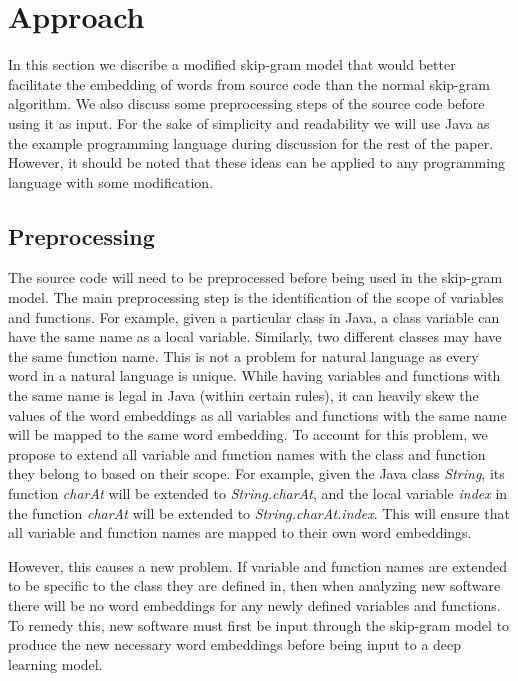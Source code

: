 \section{Approach} \label{approach}

In this section we discribe a modified skip-gram model that would better facilitate the embedding of words from source code than the normal skip-gram algorithm. We also discuss some preprocessing steps of the source code before using it as input. For the sake of simplicity and readability we will use Java as the example programming language during discussion for the rest of the paper. However, it should be noted that these ideas can be applied to any programming language with some modification.

\subsection{Preprocessing}

The source code will need to be preprocessed before being used in the skip-gram model. The main preprocessing step is the identification of the scope of variables and functions. For example, given a particular class in Java, a class variable can have the same name as a local variable. Similarly, two different classes may have the same function name. This is not a problem for natural language as every word in a natural language is unique. While having variables and functions with the same name is legal in Java (within certain rules), it can heavily skew the values of the word embeddings as all variables and functions with the same name will be mapped to the same word embedding. To account for this problem, we propose to extend all variable and function names with the class and function they belong to based on their scope. For example, given the Java class \textit{String}, its function \textit{charAt} will be extended to \textit{String.charAt}, and the local variable \textit{index} in the function \textit{charAt} will be extended to \textit{String.charAt.index}. This will ensure that all variable and function names are mapped to their own word embeddings.

However, this causes a new problem. If variable and function names are extended to be specific to the class they are defined in, then when analyzing new software there will be no word embeddings for any newly defined variables and functions. To remedy this, new software must first be input through the skip-gram model to produce the new necessary word embeddings before being input to a deep learning model.

